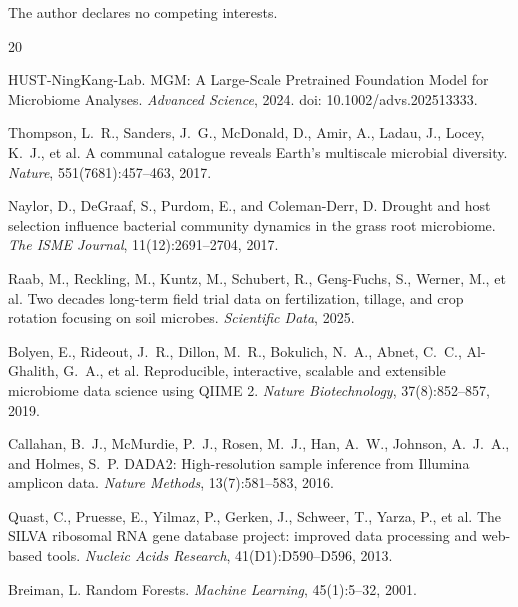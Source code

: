 \documentclass[11pt,a4paper]{article}
\begin{document}
The author declares no competing interests.


\begin{thebibliography}{20}

HUST-NingKang-Lab.
\newblock MGM: A Large-Scale Pretrained Foundation Model for Microbiome Analyses.
\newblock \emph{Advanced Science}, 2024. doi: 10.1002/advs.202513333.

Thompson, L.~R., Sanders, J.~G., McDonald, D., Amir, A., Ladau, J., Locey, K.~J., et al.
\newblock A communal catalogue reveals Earth's multiscale microbial diversity.
\newblock \emph{Nature}, 551(7681):457--463, 2017.

Naylor, D., DeGraaf, S., Purdom, E., and Coleman-Derr, D.
\newblock Drought and host selection influence bacterial community dynamics in the grass root microbiome.
\newblock \emph{The ISME Journal}, 11(12):2691--2704, 2017.

Raab, M., Reckling, M., Kuntz, M., Schubert, R., Gen{\c{s}}-Fuchs, S., Werner, M., et al.
\newblock Two decades long-term field trial data on fertilization, tillage, and crop rotation focusing on soil microbes.
\newblock \emph{Scientific Data}, 2025.

Bolyen, E., Rideout, J.~R., Dillon, M.~R., Bokulich, N.~A., Abnet, C.~C., Al-Ghalith, G.~A., et al.
\newblock Reproducible, interactive, scalable and extensible microbiome data science using QIIME 2.
\newblock \emph{Nature Biotechnology}, 37(8):852--857, 2019.

Callahan, B.~J., McMurdie, P.~J., Rosen, M.~J., Han, A.~W., Johnson, A.~J.~A., and Holmes, S.~P.
\newblock DADA2: High-resolution sample inference from Illumina amplicon data.
\newblock \emph{Nature Methods}, 13(7):581--583, 2016.

Quast, C., Pruesse, E., Yilmaz, P., Gerken, J., Schweer, T., Yarza, P., et al.
\newblock The SILVA ribosomal RNA gene database project: improved data processing and web-based tools.
\newblock \emph{Nucleic Acids Research}, 41(D1):D590--D596, 2013.

Breiman, L.
\newblock Random Forests.
\newblock \emph{Machine Learning}, 45(1):5--32, 2001.


\end{thebibliography}
\end{document}
